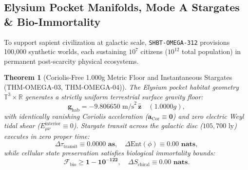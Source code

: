 \documentclass[11pt,onecolumn]{article}
\newtheorem{theorem}{Theorem}
\begin{document}
\subsection{Elysium Pocket Manifolds, Mode A Stargates \& Bio-Immortality}
\label{sec:omega_elysium_habitats}

To support sapient civilization at galactic scale, \texttt{SHBT-OMEGA-312} provisions 100,000 synthetic  worlds, each sustaining $10^7$ citizens ($10^{12}$ total population) in permanent post-scarcity physical ecosystems.

\begin{theorem}[Coriolis-Free 1.000g Metric Floor and Instantaneous Stargates (THM-OMEGA-03, THM-OMEGA-04)]
\label{thm:omega_elysium_physics}
The Elysium pocket habitat geometry $\mathbb{T}^3 \times \mathbb{R}$ generates a strictly uniform terrestrial surface gravity floor:
\begin{equation}
\mathbf{g}_{\text{hab}} = -9.806650\text{ m/s}^2\,\hat{\mathbf{z}} \quad (1.0000g),
\label{eq:g_hab_exact}
\end{equation}
with identically vanishing Coriolis acceleration ($\mathbf{a}_{\text{Cor}} \equiv \mathbf{0}$) and zero electric Weyl tidal shear ($E_{\mu\nu}^{\text{interior}} \equiv 0$). Stargate transit across the galactic disc ($105{,}700\text{ ly}$) executes in zero proper time:
\begin{equation}
\Delta\tau_{\text{transit}} \equiv \mathbf{0.0000\text{ as}}, \quad \Delta\text{Ent}(\phi) \equiv \mathbf{0.00\text{ nats}},
\label{eq:stargate_zero_transit}
\end{equation}
while cellular state preservation satisfies biological immortality bounds:
\begin{equation}
\mathcal{F}_{\text{bio}} \ge \mathbf{1 - 10^{-122}}, \quad \Delta S_{\text{chiral}} \equiv \mathbf{0.00\text{ nats}}.
\label{eq:f_bio_immortality}
\end{equation}
\end{theorem}
\end{document}
